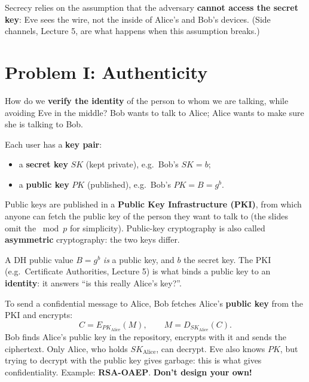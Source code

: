 \begin{warnbox}[title=The assumption behind all of it]
Secrecy relies on the assumption that the adversary \textbf{cannot access the secret key}: Eve
sees the wire, not the inside of Alice's and Bob's devices. (Side channels, Lecture 5, are what
happens when this assumption breaks.)
\end{warnbox}

\section{Problem I: Authenticity}

\begin{defnbox}[title=Authenticity]
How do we \textbf{verify the identity} of the person to whom we are talking, while
avoiding Eve in the middle? Bob wants to talk to Alice; Alice wants to make sure she is
talking to Bob.
\end{defnbox}

\begin{defnbox}[title=Public-key cryptography: key pairs and PKI]
Each user has a \textbf{key pair}:
\begin{itemize}
  \item a \textbf{secret key} $SK$ (kept private), e.g.\ Bob's $SK = b$;
  \item a \textbf{public key} $PK$ (published), e.g.\ Bob's $PK = B = g^b$.
\end{itemize}
Public keys are published in a \textbf{Public Key Infrastructure (PKI)}, from which
anyone can fetch the public key of the person they want to talk to (the slides omit the
$\bmod p$ for simplicity). Public-key cryptography is also called \textbf{asymmetric}
cryptography: the two keys differ.
\end{defnbox}

\begin{rembox}[title=Link with Diffie-Hellman]
A DH public value $B = g^b$ \emph{is} a public key, and $b$ the secret key. The PKI
(e.g.\ Certificate Authorities, Lecture 5) is what binds a public key to an
\textbf{identity}: it answers ``is this really Alice's key?''.
\end{rembox}

\begin{defnbox}[title=Public-key encryption (confidentiality)]
To send a confidential message to Alice, Bob fetches Alice's \textbf{public key} from the
PKI and encrypts:
\[
  C = E_{PK_{\text{Alice}}}(M), \qquad M = D_{SK_{\text{Alice}}}(C).
\]
Bob finds Alice's public key in the repository, encrypts with it and sends the ciphertext.
Only Alice, who holds $SK_{\text{Alice}}$, can decrypt. Eve also knows $PK$, but trying to
decrypt with the public key gives garbage: this is what gives confidentiality. Example: \textbf{RSA-OAEP}.
\textbf{Don't design your own!}
\end{defnbox}

